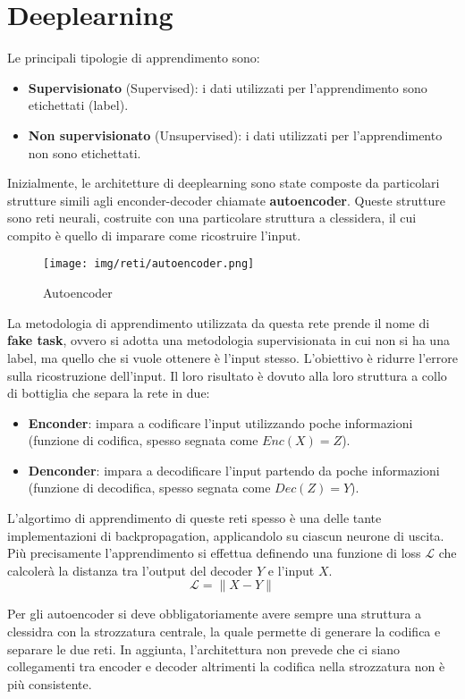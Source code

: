 \chapter{Deeplearning}
Le principali tipologie di apprendimento sono:
\begin{itemize}
    \item \textbf{Supervisionato} (Supervised): i dati utilizzati per l'apprendimento
          sono etichettati (label).
    \item \textbf{Non supervisionato} (Unsupervised): i dati utilizzati per
          l'apprendimento non sono etichettati.
\end{itemize}
Inizialmente, le architetture di deeplearning sono state composte da particolari
strutture simili agli enconder-decoder chiamate \textbf{autoencoder}. Queste
strutture sono reti neurali, costruite con una particolare struttura a clessidera,
il cui compito è quello di imparare come ricostruire l'input.
\begin{figure}[!ht]
    \centering
    \texttt{[image: img/reti/autoencoder.png]}
    \caption{Autoencoder}
    \label{fig:autoencoder}
\end{figure}
La metodologia di apprendimento utilizzata da questa rete prende il nome di
\textbf{fake task}, ovvero si adotta una metodologia supervisionata in cui non si
ha una label, ma quello che si vuole ottenere è l'input stesso. L'obiettivo
è ridurre l'errore sulla ricostruzione dell'input. Il loro risultato è dovuto
alla loro struttura a collo di bottiglia che separa la rete in due:
\begin{itemize}
    \item \textbf{Enconder}: impara a codificare l'input utilizzando poche
          informazioni (funzione di codifica, spesso segnata come $Enc(X) = Z$).
    \item \textbf{Denconder}: impara a decodificare l'input partendo da poche
          informazioni (funzione di decodifica, spesso segnata come $Dec(Z) = Y$).
\end{itemize}
L'algortimo di apprendimento di queste reti spesso è una delle tante implementazioni
di backpropagation, applicandolo su ciascun neurone di uscita. Più precisamente
l'apprendimento si effettua definendo una funzione di loss $\mathcal{L}$ che calcolerà
la distanza tra l'output del decoder $Y$ e l'input $X$.
\begin{equation}
      \mathcal{L} = \| X - Y \|
\end{equation}

Per gli autoencoder si deve obbligatoriamente avere sempre una struttura a clessidra
con la strozzatura centrale, la quale permette di generare la codifica e separare
le due reti. In aggiunta, l'architettura non prevede che ci siano collegamenti
tra encoder e decoder altrimenti la codifica nella strozzatura non è più consistente.

